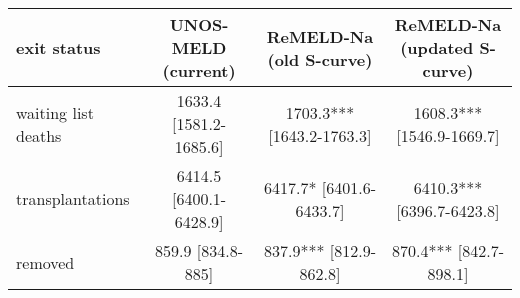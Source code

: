 
\begin{tabular}{lccc}
	\toprule
	exit status & \makecell{UNOS-MELD\\(current)} & \makecell{ReMELD-Na\\(old S-curve)} & \makecell{ReMELD-Na\\(updated S-curve)}\\
	\midrule
	waiting list deaths & 1633.4 [1581.2-1685.6] & 1703.3*** [1643.2-1763.3] & 1608.3*** [1546.9-1669.7]\\
	transplantations & 6414.5 [6400.1-6428.9] & 6417.7* [6401.6-6433.7] & 6410.3*** [6396.7-6423.8]\\
	removed & 859.9 [834.8-885] & 837.9*** [812.9-862.8] & 870.4*** [842.7-898.1]\\
	\bottomrule
\end{tabular}
